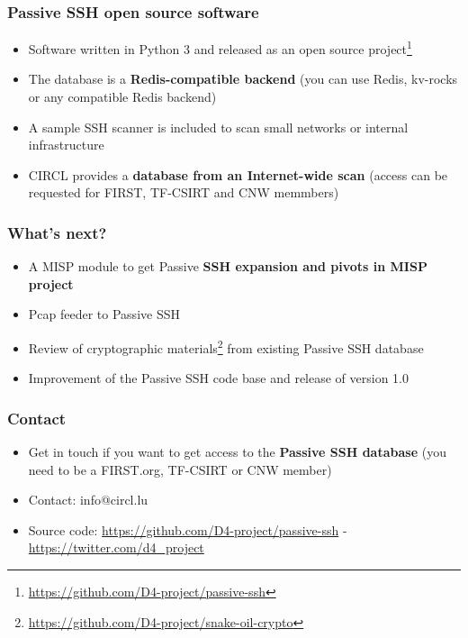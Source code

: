 \documentclass{beamer}
\begin{document}
\begin{frame}
        \frametitle{Passive SSH open source software}
        \begin{itemize}
                \item Software written in Python 3 and released as an open source project\footnote{\url{https://github.com/D4-project/passive-ssh}}
                \item The database is a {\bf Redis-compatible backend} (you can use Redis, kv-rocks or any compatible Redis backend)
                \item A sample SSH scanner is included to scan small networks or internal infrastructure
                \item CIRCL provides a {\bf database from an Internet-wide scan} (access can be requested for FIRST, TF-CSIRT and CNW memmbers)
        \end{itemize}
\end{frame}


\begin{frame}
        \frametitle{What's next?}
        \begin{itemize}
               \item A MISP module to get Passive {\bf SSH expansion and pivots in MISP project}
               \item Pcap feeder to Passive SSH
               \item Review of cryptographic materials\footnote{\url{https://github.com/D4-project/snake-oil-crypto}} from existing Passive SSH database
               \item Improvement of the Passive SSH code base and release of version 1.0
        \end{itemize}
\end{frame}

\begin{frame}
\frametitle{Contact}
\begin{itemize}
        \item Get in touch if you want to get access to the {\bf Passive SSH database} (you need to be a FIRST.org, TF-CSIRT or CNW member)
\item Contact: info@circl.lu
\item Source code: \url{https://github.com/D4-project/passive-ssh} -  \url{https://twitter.com/d4_project}
\end{itemize}
\end{frame}
\end{document}
